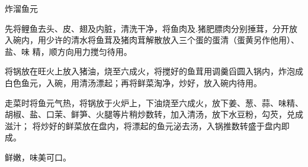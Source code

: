 \begin{recipe}{炸溜鱼元}

\ingredients


\preparation

\step 先将鲤鱼去头、皮、翅及内脏，清洗干净，将鱼肉及.猪肥膘肉分别捶茸，分开放
入碗内，用少许的清水将鱼茸及猪肉茸解散放入三个蛋的蛋清（蛋黄另作他用）、盐、味
精，顺方向用力搅匀待用。

\step 将锅放在旺火上放入猪油，烧至六成火，将搅好的鱼茸用调羹舀圆入锅内，炸泡成
白色鱼元，入碗，用清汤漂起；再将鲜菜淘净，炒好，放入碗内待用。

\step 走菜时将鱼元气热，将锅放于火炉上，下油烧至六成火，放下姜、葱、蒜、味精、
胡椒、盐、口茉、鲜笋、火腿等片稍炒数转，加入清汤，放下水豆粉，勾芡，兑成滋汁；
将炒好的鲜菜放在盘内，将漂起的鱼元泌去汤，入锅推数转盛于盘内即成。

\features

鲜嫩，味美可口。

\end{recipe}


